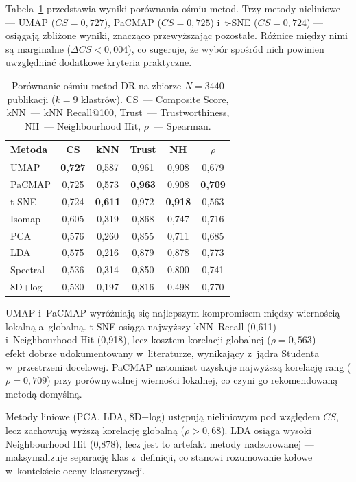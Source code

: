 \documentclass[a4paper,11pt,twocolumn]{article}
\begin{document}
Tabela~\ref{tab:dr} przedstawia wyniki porównania ośmiu metod.
Trzy metody nieliniowe --- UMAP ($CS=0{,}727$), PaCMAP ($CS=0{,}725$)
i~t-SNE ($CS=0{,}724$) --- osiągają zbliżone wyniki, znacząco
przewyższając pozostałe. Różnice między nimi są marginalne
($\Delta CS < 0{,}004$), co sugeruje, że wybór spośród nich powinien
uwzględniać dodatkowe kryteria praktyczne.

\begin{table}[t]
\centering
\caption{Porównanie ośmiu metod DR na zbiorze $N=3440$ publikacji
($k=9$ klastrów). CS~--- Composite Score,
kNN~--- kNN Recall@100, Trust~--- Trustworthiness,
NH~--- Neighbourhood Hit, $\rho$~--- Spearman.}
\label{tab:dr}
\small
\setlength{\tabcolsep}{3pt}
\begin{tabular}{@{}lccccc@{}}
\toprule
Metoda & CS & kNN & Trust & NH & $\rho$ \\
\midrule
UMAP      & \textbf{0,727} & 0,587 & 0,961 & 0,908 & 0,679 \\
PaCMAP    & 0,725 & 0,573 & \textbf{0,963} & 0,908 & \textbf{0,709} \\
t-SNE     & 0,724 & \textbf{0,611} & 0,972 & \textbf{0,918} & 0,563 \\
Isomap    & 0,605 & 0,319 & 0,868 & 0,747 & 0,716 \\
PCA       & 0,576 & 0,260 & 0,855 & 0,711 & 0,685 \\
LDA       & 0,575 & 0,216 & 0,879 & 0,878 & 0,773 \\
Spectral  & 0,536 & 0,314 & 0,850 & 0,800 & 0,741 \\
8D+log    & 0,530 & 0,197 & 0,816 & 0,498 & 0,770 \\
\bottomrule
\end{tabular}
\end{table}

UMAP i~PaCMAP wyróżniają się najlepszym kompromisem między wiernością
lokalną a~globalną. t-SNE osiąga najwyższy kNN~Recall (0,611) i~Neighbourhood
Hit (0,918), lecz kosztem korelacji globalnej ($\rho=0{,}563$) ---
efekt dobrze udokumentowany w~literaturze, wynikający z~jądra Studenta
w~przestrzeni docelowej. PaCMAP natomiast uzyskuje najwyższą korelację
rang ($\rho=0{,}709$) przy porównywalnej wierności lokalnej, co czyni go
rekomendowaną metodą domyślną.

Metody liniowe (PCA, LDA, 8D+log) ustępują nieliniowym pod względem
$CS$, lecz zachowują wyższą korelację globalną ($\rho > 0{,}68$).
LDA osiąga wysoki Neighbourhood Hit (0,878), lecz jest to artefakt
metody nadzorowanej --- maksymalizuje separację klas z~definicji,
co stanowi rozumowanie kołowe w~kontekście oceny klasteryzacji.
\end{document}
